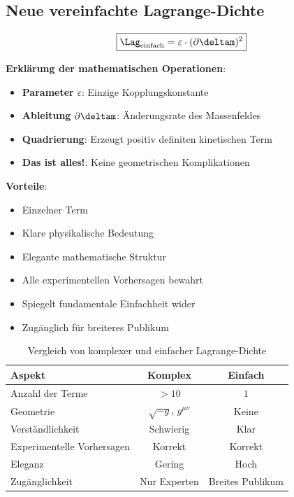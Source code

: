 	\subsection{Neue vereinfachte Lagrange-Dichte}
	
	\begin{equation}
		\boxed{\Lag_{\text{einfach}} = \varepsilon \cdot (\partial \deltam)^2}
	\end{equation}
	
	\textbf{Erklärung der mathematischen Operationen}:
	\begin{itemize}
		\item \textbf{Parameter} $\varepsilon$: Einzige Kopplungskonstante
		\item \textbf{Ableitung} $\partial \deltam$: Änderungsrate des Massenfeldes
		\item \textbf{Quadrierung}: Erzeugt positiv definiten kinetischen Term
		\item \textbf{Das ist alles!}: Keine geometrischen Komplikationen
	\end{itemize}
	
	\textbf{Vorteile}:
	\begin{itemize}
		\item Einzelner Term
		\item Klare physikalische Bedeutung
		\item Elegante mathematische Struktur
		\item Alle experimentellen Vorhersagen bewahrt
		\item Spiegelt fundamentale Einfachheit wider
		\item Zugänglich für breiteres Publikum
	\end{itemize}
	
	\begin{table}[htbp]
		\centering
		\begin{tabular}{lcc}
			\toprule
			\textbf{Aspekt} & \textbf{Komplex} & \textbf{Einfach} \\
			\midrule
			Anzahl der Terme & $>10$ & $1$ \\
			Geometrie & $\sqrt{-g}$, $g^{\mu\nu}$ & Keine \\
			Verständlichkeit & Schwierig & Klar \\
			Experimentelle Vorhersagen & Korrekt & Korrekt \\
			Eleganz & Gering & Hoch \\
			Zugänglichkeit & Nur Experten & Breites Publikum \\
			\bottomrule
		\end{tabular}
		\caption{Vergleich von komplexer und einfacher Lagrange-Dichte}
		\label{tab:complexity_comparison}
	\end{table}
	
